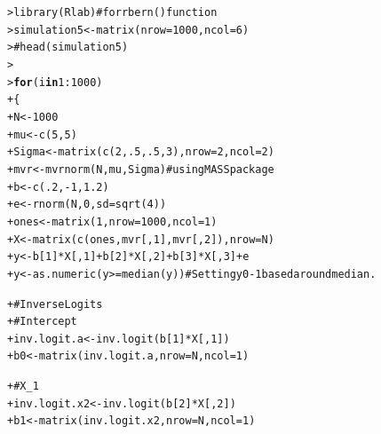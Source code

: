 \documentclass[12pt]{article}\usepackage[]{graphicx}\usepackage[]{color}
\makeatletter
\newcommand{\hlnum}[1]{\textcolor[rgb]{0.82,0.78,0.62}{#1}}%
\newcommand{\hlcom}[1]{\textcolor[rgb]{0.404,0.408,0.42}{#1}}%
\newcommand{\hlopt}[1]{\textcolor[rgb]{0.882,0.878,0.898}{#1}}%
\newcommand{\hlstd}[1]{\textcolor[rgb]{0.882,0.878,0.898}{#1}}%
\newcommand{\hlkwa}[1]{\textcolor[rgb]{0.384,0.675,0.808}{\textbf{#1}}}%
\newcommand{\hlkwb}[1]{\textcolor[rgb]{0.902,0.675,0.196}{#1}}%
\newcommand{\hlkwc}[1]{\textcolor[rgb]{0.812,0.522,0.388}{#1}}%
\newcommand{\hlkwd}[1]{\textcolor[rgb]{0.733,0.388,0.812}{#1}}%
\newenvironment{kframe}{%
 \def\at@end@of@kframe{}%
 \ifinner\ifhmode%
  \def\at@end@of@kframe{\end{minipage}}%
  \begin{minipage}{\columnwidth}%
 \fi\fi%
 \def\FrameCommand##1{\hskip\@totalleftmargin \hskip-\fboxsep
 \colorbox{shadecolor}{##1}\hskip-\fboxsep
     \hskip-\linewidth \hskip-\@totalleftmargin \hskip\columnwidth}%
 \MakeFramed {\advance\hsize-\width
   \@totalleftmargin\z@ \linewidth\hsize
   \@setminipage}}%
 {\par\unskip\endMakeFramed%
 \at@end@of@kframe}
\newenvironment{knitrout}{}{} %
\makeatother
\begin{document}
\begin{flushleft}
\begin{knitrout}
\color{fgcolor}\begin{kframe}
\begin{alltt}
\hlstd{> }\hlkwd{library}\hlstd{(Rlab)} \hlcom{# for rbern() function}
\hlstd{> }\hlstd{simulation5} \hlkwb{<-} \hlkwd{matrix}\hlstd{(}\hlkwc{nrow} \hlstd{=} \hlnum{1000}\hlstd{,} \hlkwc{ncol} \hlstd{=} \hlnum{6}\hlstd{)}
\hlstd{> }\hlcom{# head(simulation5)}
\hlstd{> }
\hlstd{> }\hlkwa{for} \hlstd{(i} \hlkwa{in} \hlnum{1}\hlopt{:}\hlnum{1000}\hlstd{)}
\hlstd{+ }\hlstd{\{}
\hlstd{+ }  \hlstd{N} \hlkwb{<-} \hlnum{1000}
\hlstd{+ }  \hlstd{mu} \hlkwb{<-} \hlkwd{c}\hlstd{(}\hlnum{5}\hlstd{,}\hlnum{5}\hlstd{)}
\hlstd{+ }  \hlstd{Sigma} \hlkwb{<-} \hlkwd{matrix}\hlstd{(} \hlkwd{c}\hlstd{(}\hlnum{2}\hlstd{,} \hlnum{.5}\hlstd{,} \hlnum{.5}\hlstd{,} \hlnum{3} \hlstd{),} \hlkwc{nrow} \hlstd{=} \hlnum{2}\hlstd{,} \hlkwc{ncol}\hlstd{=} \hlnum{2}\hlstd{)}
\hlstd{+ }  \hlstd{mvr} \hlkwb{<-} \hlkwd{mvrnorm}\hlstd{(N, mu, Sigma)} \hlcom{# using MASS package}
\hlstd{+ }  \hlstd{b} \hlkwb{<-} \hlkwd{c}\hlstd{(}\hlnum{.2}\hlstd{,} \hlopt{-}\hlnum{1}\hlstd{,} \hlnum{1.2}\hlstd{)}
\hlstd{+ }  \hlstd{e} \hlkwb{<-} \hlkwd{rnorm}\hlstd{(N,} \hlnum{0}\hlstd{,} \hlkwc{sd}\hlstd{=}\hlkwd{sqrt}\hlstd{(}\hlnum{4}\hlstd{))}
\hlstd{+ }  \hlstd{ones} \hlkwb{<-} \hlkwd{matrix}\hlstd{(}\hlnum{1}\hlstd{,} \hlkwc{nrow}\hlstd{=}\hlnum{1000}\hlstd{,} \hlkwc{ncol}\hlstd{=}\hlnum{1}\hlstd{)}
\hlstd{+ }  \hlstd{X} \hlkwb{<-} \hlkwd{matrix}\hlstd{(}\hlkwd{c}\hlstd{(ones, mvr[,}\hlnum{1}\hlstd{], mvr[,}\hlnum{2}\hlstd{]),} \hlkwc{nrow}\hlstd{=N)}
\hlstd{+ }  \hlstd{y} \hlkwb{<-} \hlstd{b[}\hlnum{1}\hlstd{]}\hlopt{*}\hlstd{X[,}\hlnum{1}\hlstd{]}\hlopt{+} \hlstd{b[}\hlnum{2}\hlstd{]}\hlopt{*}\hlstd{X[,}\hlnum{2}\hlstd{]}\hlopt{+} \hlstd{b[}\hlnum{3}\hlstd{]}\hlopt{*}\hlstd{X[,}\hlnum{3}\hlstd{]} \hlopt{+} \hlstd{e}
\hlstd{+ }  \hlstd{y} \hlkwb{<-} \hlkwd{as.numeric}\hlstd{(y} \hlopt{>=} \hlkwd{median}\hlstd{(y))} \hlcom{# Setting y 0-1 based around median.}

\hlstd{+ }  \hlcom{# Inverse Logits}
\hlstd{+ }  \hlcom{# Intercept}
\hlstd{+ }  \hlstd{inv.logit.a} \hlkwb{<-} \hlkwd{inv.logit}\hlstd{(b[}\hlnum{1}\hlstd{]}\hlopt{*}\hlstd{X[,}\hlnum{1}\hlstd{])}
\hlstd{+ }  \hlstd{b0} \hlkwb{<-} \hlkwd{matrix}\hlstd{(inv.logit.a,} \hlkwc{nrow}\hlstd{=N,} \hlkwc{ncol}\hlstd{=} \hlnum{1}\hlstd{)}

\hlstd{+ }  \hlcom{#X_1}
\hlstd{+ }  \hlstd{inv.logit.x2} \hlkwb{<-} \hlkwd{inv.logit}\hlstd{(b[}\hlnum{2}\hlstd{]}\hlopt{*}\hlstd{X[,}\hlnum{2}\hlstd{])}
\hlstd{+ }  \hlstd{b1} \hlkwb{<-} \hlkwd{matrix}\hlstd{(inv.logit.x2,} \hlkwc{nrow}\hlstd{=N,} \hlkwc{ncol}\hlstd{=} \hlnum{1}\hlstd{)}


\end{alltt}
\end{kframe}
\end{knitrout}
\end{flushleft}
\end{document}
